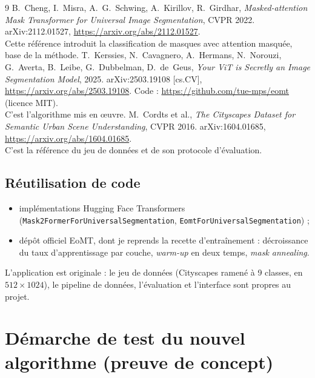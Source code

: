 \documentclass[11pt,a4paper]{article}
\begin{document}
\renewcommand{\refname}{\vspace{-2.2em}}
\begin{thebibliography}{9}
 B.~Cheng, I.~Misra, A.~G.~Schwing, A.~Kirillov,
  R.~Girdhar, \emph{Masked-attention Mask Transformer for Universal Image
  Segmentation}, CVPR 2022. arXiv:2112.01527,
  \url{https://arxiv.org/abs/2112.01527}.\\
  Cette référence introduit la classification de masques avec attention
  masquée, base de la méthode.
 T.~Kerssies, N.~Cavagnero,
  A.~Hermans, N.~Norouzi, G.~Averta, B.~Leibe, G.~Dubbelman, D.~de~Geus,
  \emph{Your ViT is Secretly an Image Segmentation Model}, 2025.
  arXiv:2503.19108 [cs.CV], \url{https://arxiv.org/abs/2503.19108}.
  Code : \url{https://github.com/tue-mps/eomt} (licence MIT).\\
  C'est l'algorithme mis en œuvre.
 M.~Cordts et al., \emph{The Cityscapes Dataset for
  Semantic Urban Scene Understanding}, CVPR 2016. arXiv:1604.01685,
  \url{https://arxiv.org/abs/1604.01685}.\\
  C'est la référence du jeu de données et de son protocole d'évaluation.
\end{thebibliography}

\subsection*{Réutilisation de code}

\begin{itemize}
  \item implémentations Hugging Face Transformers
        (\texttt{Mask2Former\allowbreak For\allowbreak Universal\allowbreak Segmentation},
        \texttt{Eomt\allowbreak For\allowbreak Universal\allowbreak Segmentation}) ;
  \item dépôt officiel EoMT, dont je reprends la recette d'entraînement :
        décroissance du taux d'apprentissage par couche, \emph{warm-up} en deux
        temps, \emph{mask annealing}.
\end{itemize}

L'application est originale : le jeu de données (Cityscapes ramené à
9 classes, en $512\times1024$), le pipeline de données, l'évaluation et
l'interface sont propres au projet.

\section*{Démarche de test du nouvel algorithme (preuve de concept)}
\end{document}
